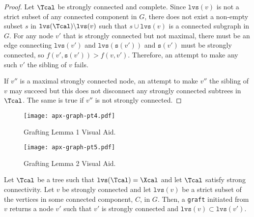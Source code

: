 \documentclass{article} \usepackage[utf8]{inputenc} \usepackage[T1]{fontenc}    \usepackage{hyperref}       \usepackage{url}            \usepackage{booktabs}       \usepackage{amsfonts}       \usepackage{nicefrac}       \usepackage{microtype}      \usepackage{geometry}
\newcommand{\graft}{\texttt{graft}\xspace}
\newcommand{\lvs}[1]{\ensuremath{\texttt{lvs}(#1)}}
\newcommand{\sib}[1]{\ensuremath{\texttt{s}}(#1)\xspace}
\begin{document}
\begin{appendix}
\begin{proof}
Let $\Tcal$ be strongly connected and complete. Since $\lvs{v}$ is not
a strict subset of any connected component in $G$, there does not
exist a non-empty subset $s$ in $\lvs{\Tcal} \backslash \lvs{v}$ such
that $s \cup \lvs{v}$ is a connected subgraph in $G$. For any node
$v'$ that is strongly connected but not maximal, there must be an edge
connecting $\lvs{v'}$ and $\lvs{\sib{v'}}$ and $\sib{v'}$ must be
strongly connected, so $f(v', \sib{v'}) > f(v, v')$.  Therefore, an
attempt to make any such $v'$ the sibling of $v$ fails.

If $v''$ is a maximal strongly connected node, an attempt to make
$v''$ the sibling of $v$ may succeed but this does not disconnect any
strongly connected subtrees in $\Tcal$.  The same is true if $v''$ is
not strongly connected.
\end{proof}

\begin{figure*}[t!]
\captionsetup[subfigure]{justification=centering}
\begin{subfigure}[h]{0.49\textwidth}
  \centerline{\texttt{[image: apx-graph-pt4.pdf]}}
  \caption{Grafting Lemma 1 Visual Aid.}
    \label{fig:graft-lem1}
\end{subfigure}
\begin{subfigure}[h]{0.49\textwidth}
  \centerline{\texttt{[image: apx-graph-pt5.pdf]}}
  \caption{Grafting Lemma 2 Visual Aid.}
  \label{fig:graft-lem2}
\end{subfigure}
\caption{We reuse the graph in Figure \ref{fig:grinch-graph}. The tree
  in Figure \ref{fig:graft-lem1} is strongly connected and
  complete. Consider the node $v$. A graft initiated from $v$ may make
  $v''$ a sibling of $v$ because $\lvs{v}$ is not a (strict) subset of
  a connected component and $v''$ is maximal. After such a graft,
  notice that the tree would still satisfy strong connectivity and
  completeness.  The tree in Figure \ref{fig:graft-lem2} is strongly
  connected but not complete. Consider $x_3$ which plays the role of
  $v$ in the proof of Grafting Lemma 2. When a constrained nearest
  neighbor search is executed from its parent, $v_1$, the leaf
  $x_4$--which plays the role of $\ell$--is returned. If $v_1$ and
  $v_2$ are made siblings, their parent is strongly
  connected.}
\label{fig:graft-lem-12}
\end{figure*}
 
\begin{lemma}
\label{thm:grafting1}
Let $\Tcal$ be a tree such that $\lvs{\Tcal} = \Xcal$ and let $\Tcal$
satisfy strong connectivity. Let $v$ be strongly connected and let
$\lvs{v}$ be a strict subset of the vertices in some connected
component, $C$, in $G$.  Then, a \graft initiated from $v$ returns a
node $v'$ such that $v'$ is strongly connected and $\lvs{v} \subset
\lvs{v'}$.
\end{lemma}


\end{appendix}
\end{document}
